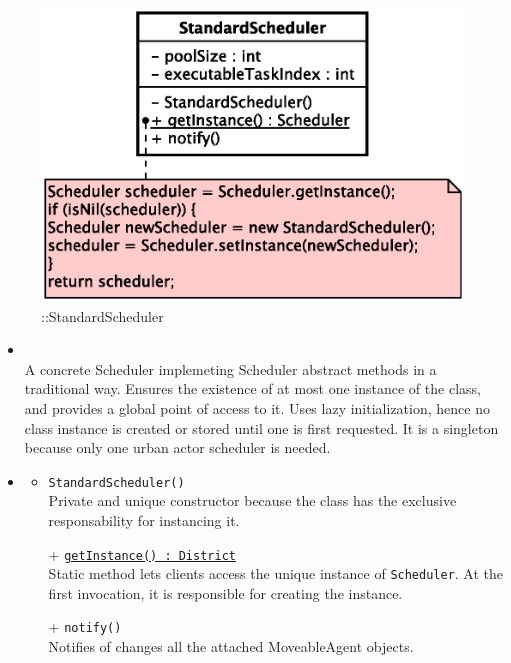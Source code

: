 \begin{figure}[h]
\centering
\includegraphics[scale=0.6,keepaspectratio]{images/solution/app/backend/standard_scheduler.eps}
\caption{\pScheduling::StandardScheduler}
\label{fig:sd-app-scheduling-standard-scheduler}
\end{figure}
\FloatBarrier
\begin{itemize}
  \item \textbf{\descr} \\
    A concrete Scheduler implemeting Scheduler abstract methods in a traditional way.
    Ensures the existence of at most one instance of the class, 
 	and provides a global point of access to it.
  	Uses lazy initialization, hence no class instance is created 
  	or stored until one is first requested.
    It is a singleton because only one urban actor scheduler is needed.
  \item \textbf{\ops}
  \begin{itemize}
    \item \texttt{StandardScheduler()} \\
    Private and unique constructor because the class has the exclusive 
    responsability for instancing it.
    \item[+] \texttt{\underline{getInstance() : District}} \\
    Static method lets clients access the unique instance 
    of \texttt{Scheduler}. At the first invocation, it is responsible 
    for creating the instance.
    \item[+] \texttt{notify()} \\
	Notifies of changes all the attached MoveableAgent objects.
  \end{itemize}
\end{itemize}
